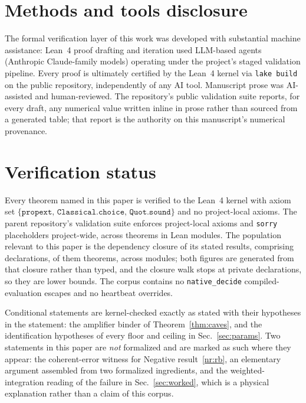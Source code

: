 \documentclass[aps,pra,reprint,nofootinbib,superscriptaddress]{revtex4-2}
\theoremstyle{plain}
\theoremstyle{definition}
\theoremstyle{remark}
\begin{document}
\section*{Methods and tools disclosure}
The formal verification layer of this work was developed with substantial
machine assistance: Lean~4 proof drafting and iteration used LLM-based
agents (Anthropic Claude-family models) operating under the project's
staged validation pipeline. Every proof is ultimately certified by the
Lean~4 kernel via \texttt{lake build} on the public repository,
independently of any AI tool. Manuscript prose was AI-assisted and
human-reviewed. The repository's public validation suite reports, for
every draft, any numerical value written inline in prose rather than
sourced from a generated table; that report is the authority on this
manuscript's numerical provenance.

\appendix

\section{Verification status}
\label{app:verification}

Every theorem named in this paper is verified to the Lean~4 kernel with
axiom set $\{\texttt{propext},\,\texttt{Classical.choice},\,
\texttt{Quot.sound}\}$ and no project-local axioms. The parent
repository's validation suite enforces \axiomcount{} project-local axioms
and \sorrycount{} \texttt{sorry} placeholders project-wide, across
\totaltheorems{} theorems in \leanmodules{} Lean modules. The population
relevant to this paper is the dependency closure of its stated results,
comprising \bundleDecls{} declarations, \bundleTheorems{} of them
theorems, across \bundleModules{} modules; both figures are generated
from that closure rather than typed, and the closure walk stops at
private declarations, so they are lower bounds. The corpus contains no
\texttt{native\_decide} compiled-evaluation escapes and no heartbeat
overrides.

Conditional statements are kernel-checked exactly as stated with their
hypotheses in the statement: the amplifier binder of
Theorem~\ref{thm:caves}, and the identification hypotheses of every floor
and ceiling in Sec.~\ref{sec:params}. Two statements in this paper are
\emph{not} formalized and are marked as such where they appear: the
coherent-error witness for Negative result~\ref{nr:rb}, an elementary
argument assembled from two formalized ingredients, and the
weighted-integration reading of the failure in Sec.~\ref{sec:worked},
which is a physical explanation rather than a claim of this corpus.
\end{document}

